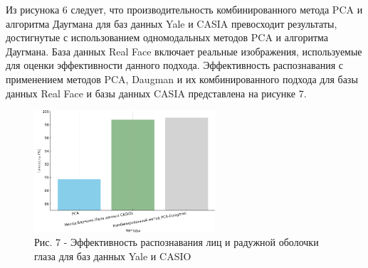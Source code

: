 \begin{multicols}{2}
Из рисунока 6 следует, что производительность комбинированного метода
PCA и алгоритма Даугмана для баз данных Yale и CASIA превосходит
результаты, достигнутые с использованием одномодальных методов PCA и
алгоритма Даугмана. База данных Real Face включает реальные изображения,
используемые для оценки эффективности данного подхода. Эффективность
распознавания с применением методов PCA, Daugman и их комбинированного
подхода для базы данных Real Face и базы данных CASIA представлена на
рисунке 7.
\end{multicols}

\begin{figure}[H]
	\centering
	\includegraphics[width=0.6\textwidth]{assets/89}
	\caption*{Рис. 7 - Эффективность распознавания лиц и радужной оболочки глаза для баз данных Yale и CASIO}
\end{figure}

